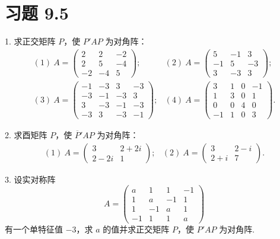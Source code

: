 \documentclass[UTF8,12pt,a4paper,fontset=fandol]{ctexart}
\begin{document}
\section*{习题 9.5}

1. 求正交矩阵 $P$，使 $P'AP$ 为对角阵：
\[
\begin{array}{ll}
(1)\ A=
\left(\begin{array}{ccc}
2 & 2 & -2\\
2 & 5 & -4\\
-2 & -4 & 5
\end{array}\right);
&
(2)\ A=
\left(\begin{array}{ccc}
5 & -1 & 3\\
-1 & 5 & -3\\
3 & -3 & 3
\end{array}\right);
\\[3em]
(3)\ A=
\left(\begin{array}{rrrr}
-1 & -3 & 3 & -3\\
-3 & -1 & -3 & 3\\
3 & -3 & -1 & -3\\
-3 & 3 & -3 & -1
\end{array}\right);
&
(4)\ A=
\left(\begin{array}{rrrr}
3 & 1 & 0 & -1\\
1 & 3 & 0 & 1\\
0 & 0 & 4 & 0\\
-1 & 1 & 0 & 3
\end{array}\right).
\end{array}
\]

2. 求酉矩阵 $P$，使 $\overline P'AP$ 为对角阵：
\[
\begin{array}{ll}
(1)\ A=
\left(\begin{array}{cc}
3 & 2+2i\\
2-2i & 1
\end{array}\right);
&
(2)\ A=
\left(\begin{array}{cc}
3 & 2-i\\
2+i & 7
\end{array}\right).
\end{array}
\]

3. 设实对称阵
\[
  A=
  \left(\begin{array}{rrrr}
    a & 1 & 1 & -1\\
    1 & a & -1 & 1\\
    1 & -1 & a & 1\\
    -1 & 1 & 1 & a
  \end{array}\right)
\]
有一个单特征值 $-3$，求 $a$ 的值并求正交矩阵 $P$，使 $P'AP$ 为对角阵.
\end{document}

